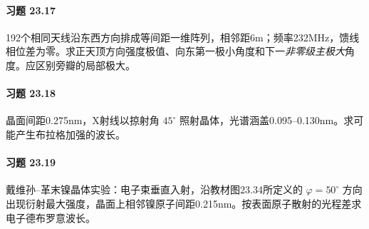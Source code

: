 \paragraph{习题 23.17}
192个相同天线沿东西方向排成等间距一维阵列，相邻距6m；频率232MHz，馈线相位差为零。求正天顶方向强度极值、向东第一极小角度和下一\emph{非零级主极大}角度。应区别旁瓣的局部极大。
\paragraph{习题 23.18}
晶面间距0.275nm，X射线以掠射角 \(45^\circ\) 照射晶体，光谱涵盖0.095--0.130nm。求可能产生布拉格加强的波长。
\paragraph{习题 23.19}
戴维孙--革末镍晶体实验：电子束垂直入射，沿教材图23.34所定义的 \(\varphi=50^\circ\) 方向出现衍射最大强度，晶面上相邻镍原子间距0.215nm。按表面原子散射的光程差求电子德布罗意波长。
